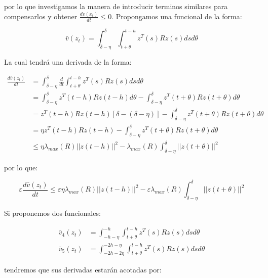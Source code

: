         por lo que investigamos la manera de introducir terminos similares para compensarlos y obtener $\frac{d v(x_t)}{dt} \leq 0$. Propongamos una funcional de la forma:

        \begin{equation}
            \bar{v}(z_t) = \int_{\delta-\eta}^{\delta} \int_{t + \theta}^{t - h} z^T(s) R z(s) ds d\theta
        \end{equation}

        La cual tendrá una derivada de la forma:

        \begin{align*}
            \frac{d\bar{v}(z_t)}{dt} &= \int_{\delta-\eta}^{\delta} \frac{d}{dt} \int_{t + \theta}^{t - h} z^T(s) R z(s) ds d\theta \\
            &= \int_{\delta-\eta}^{\delta} z^T(t-h) R z(t-h) d\theta - \int_{\delta-\eta}^{\delta} z^T(t+\theta) R z(t+\theta) d\theta \\
            &= z^T(t-h) R z(t-h) \left[\delta - (\delta-\eta)\right] - \int_{\delta-\eta}^{\delta} z^T(t+\theta) R z(t+\theta) d\theta \\
            &= \eta z^T(t-h) R z(t-h) - \int_{\delta-\eta}^{\delta} z^T(t+\theta) R z(t+\theta) d\theta \\
            &\leq \eta \lambda_{max}(R) \left|\left| z(t - h) \right|\right|^2 - \lambda_{max}(R) \int_{\delta-\eta}^{\delta} \left|\left| z(t + \theta) \right|\right|^2 
        \end{align*}

        por lo que:

        \begin{equation*}
            \varepsilon \frac{d\bar{v}(z_t)}{dt} \leq \varepsilon \eta \lambda_{max}(R) \left|\left| z(t - h) \right|\right|^2 - \varepsilon \lambda_{max}(R) \int_{\delta-\eta}^{\delta} \left|\left| z(t + \theta) \right|\right|^2 
        \end{equation*}

        Si proponemos dos funcionales:

        \begin{align*}
            \bar{v}_4(z_t) &= \int_{-h-\eta}^{-h} \int_{t + \theta}^{t - h} z^T(s) R z(s) ds d\theta \\
            \bar{v}_5(z_t) &= \int_{-2h-2\eta}^{-2h-\eta} \int_{t + \theta}^{t - h} z^T(s) R z(s) ds d\theta
        \end{align*}
        
        tendremos que sus derivadas estarán acotadas por:

